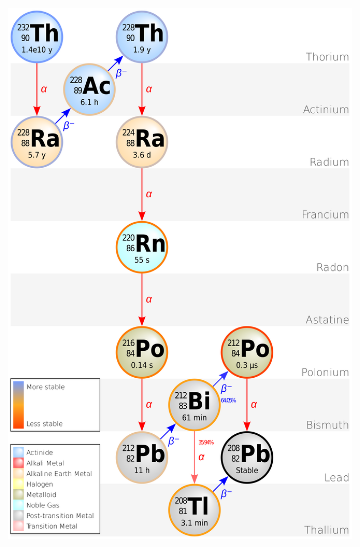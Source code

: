 \begin{figure}
    \centering
    \begin{subfigure}[t]{0.5\textwidth}
        \centering
        \includegraphics[width=\textwidth]{Decay_Chain_of_Thorium-232}
    \end{subfigure}%
    \begin{subfigure}[t]{0.5\textwidth}
        \centering

\end{subfigure}
\end{figure}
